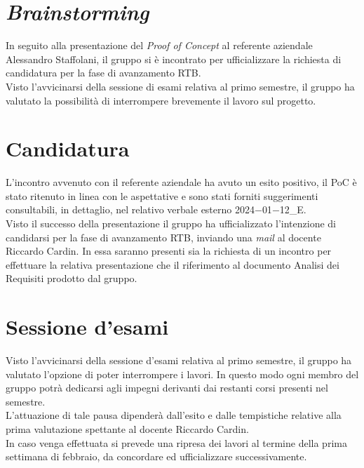 \section{\textit{Brainstorming}}
In seguito alla presentazione del \textit{Proof of Concept} al referente aziendale Alessandro Staffolani, il gruppo si è incontrato per ufficializzare la richiesta di candidatura per la fase di avanzamento RTB.\\
Visto l'avvicinarsi della sessione di esami relativa al primo semestre, il gruppo ha valutato la possibilità di interrompere brevemente il lavoro sul progetto.

\section{Candidatura}
L'incontro avvenuto con il referente aziendale ha avuto un esito positivo, il PoC è stato ritenuto in linea con le aspettative e sono stati forniti suggerimenti consultabili, in dettaglio, nel relativo verbale esterno 2024$-$01$-$12\_E. \\
Visto il successo della presentazione il gruppo ha ufficializzato l'intenzione di candidarsi per la fase di avanzamento RTB, inviando una \textit{mail} al docente Riccardo Cardin.
In essa saranno presenti sia la richiesta di un incontro per effettuare la relativa presentazione che il riferimento al documento Analisi dei Requisiti prodotto dal gruppo.

\section{Sessione d'esami}
Visto l'avvicinarsi della sessione d'esami relativa al primo semestre, il gruppo ha valutato l'opzione di poter interrompere i lavori.
In questo modo ogni membro del gruppo potrà dedicarsi agli impegni derivanti dai restanti corsi presenti nel semestre. \\
L'attuazione di tale pausa dipenderà dall'esito e dalle tempistiche relative alla prima valutazione spettante al docente Riccardo Cardin.\\
In caso venga effettuata si prevede una ripresa dei lavori al termine della prima settimana di febbraio, da concordare ed ufficializzare successivamente.